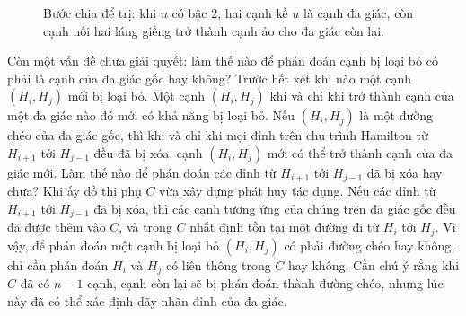\documentclass[11pt]{article}
\begin{document}
\begin{figure}[ht]
\centering
{}
\caption{Bước chia để trị: khi \(u\) có bậc \(2\), hai cạnh kề \(u\) là cạnh
đa giác, còn cạnh nối hai láng giềng trở thành cạnh ảo cho đa giác còn lại.}
\end{figure}

Còn một vấn đề chưa giải quyết: làm thế nào để phán đoán cạnh bị loại bỏ có
phải là cạnh của đa giác gốc hay không? Trước hết xét khi nào một cạnh
\((H_i,H_j)\) mới bị loại bỏ. Một cạnh \((H_i,H_j)\) khi và chỉ khi trở thành
cạnh của một đa giác nào đó mới có khả năng bị loại bỏ. Nếu \((H_i,H_j)\) là
một đường chéo của đa giác gốc, thì khi và chỉ khi mọi đỉnh trên chu trình
Hamilton từ \(H_{i+1}\) tới \(H_{j-1}\) đều đã bị xóa, cạnh \((H_i,H_j)\) mới
có thể trở thành cạnh của đa giác mới. Làm thế nào để phán đoán các đỉnh từ
\(H_{i+1}\) tới \(H_{j-1}\) đã bị xóa hay chưa? Khi ấy đồ thị phụ \(C\) vừa
xây dựng phát huy tác dụng. Nếu các đỉnh từ \(H_{i+1}\) tới \(H_{j-1}\) đã bị
xóa, thì các cạnh tương ứng của chúng trên đa giác gốc đều đã được thêm vào
\(C\), và trong \(C\) nhất định tồn tại một đường đi từ \(H_i\) tới \(H_j\).
Vì vậy, để phán đoán một cạnh bị loại bỏ \((H_i,H_j)\) có phải đường chéo hay
không, chỉ cần phán đoán \(H_i\) và \(H_j\) có liên thông trong \(C\) hay
không. Cần chú ý rằng khi \(C\) đã có \(n-1\) cạnh, cạnh còn lại sẽ bị phán
đoán thành đường chéo, nhưng lúc này đã có thể xác định dãy nhãn đỉnh của đa
giác.
\end{document}
